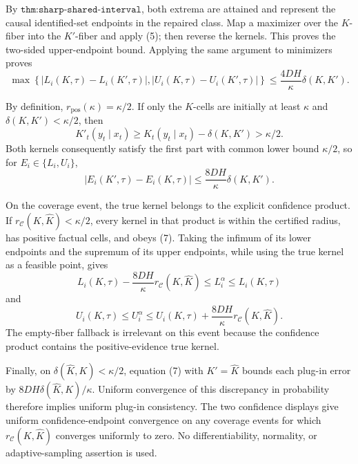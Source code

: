 By \(\texttt{thm:sharp-shared-interval}\), both extrema are attained and represent the causal identified-set endpoints in the repaired class.  Map a maximizer over the \(K\)-fiber into the \(K'\)-fiber and apply (5); then reverse the kernels.  This proves the two-sided upper-endpoint bound.  Applying the same argument to minimizers proves
\[
 \max\left\{|L_i(K,\tau)-L_i(K',\tau)|,
 |U_i(K,\tau)-U_i(K',\tau)|\right\}
 \le\frac{4DH}{\kappa}\delta(K,K'). \tag{6}
\]

By definition, \(r_{\mathrm{pos}}(\kappa)=\kappa/2\).  If only the \(K\)-cells are initially at least \(\kappa\) and \(\delta(K,K')<\kappa/2\), then
\[
 K'_t(y_t\mid x_t)\ge K_t(y_t\mid x_t)-\delta(K,K')>\kappa/2.
\]
Both kernels consequently satisfy the first part with common lower bound \(\kappa/2\), so for \(E_i\in\{L_i,U_i\}\),
\[
 |E_i(K',\tau)-E_i(K,\tau)|
 \le\frac{8DH}{\kappa}\delta(K,K'). \tag{7}
\]

On the coverage event, the true kernel belongs to the explicit confidence product.  If \(r_{\mathcal C}(K,\widehat K)<\kappa/2\), every kernel in that product is within the certified radius, has positive factual cells, and obeys (7).  Taking the infimum of its lower endpoints and the supremum of its upper endpoints, while using the true kernel as a feasible point, gives
\[
 L_i(K,\tau)-\frac{8DH}{\kappa}r_{\mathcal C}(K,\widehat K)
 \le L_i^\alpha\le L_i(K,\tau)
\]
and
\[
 U_i(K,\tau)\le U_i^\alpha
 \le U_i(K,\tau)+\frac{8DH}{\kappa}r_{\mathcal C}(K,\widehat K).
\]
The empty-fiber fallback is irrelevant on this event because the confidence product contains the positive-evidence true kernel.

Finally, on \(\delta(\widehat K,K)<\kappa/2\), equation (7) with \(K'=\widehat K\) bounds each plug-in error by \(8DH\delta(\widehat K,K)/\kappa\).  Uniform convergence of this discrepancy in probability therefore implies uniform plug-in consistency.  The two confidence displays give uniform confidence-endpoint convergence on any coverage events for which \(r_{\mathcal C}(K,\widehat K)\) converges uniformly to zero.  No differentiability, normality, or adaptive-sampling assertion is used.
